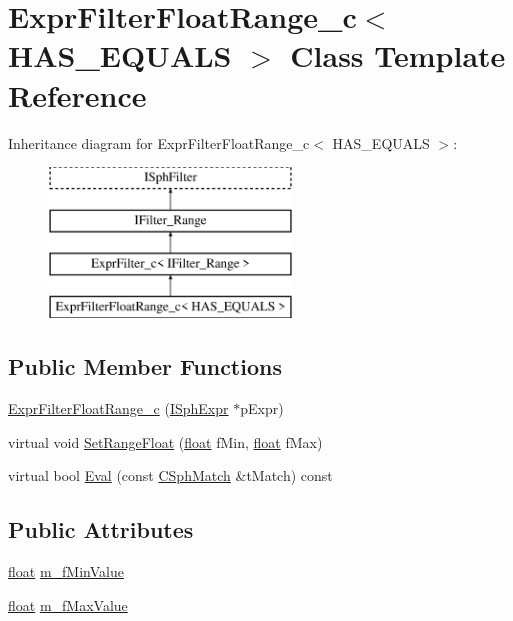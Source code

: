 \hypertarget{classExprFilterFloatRange__c}{\section{Expr\-Filter\-Float\-Range\-\_\-c$<$ H\-A\-S\-\_\-\-E\-Q\-U\-A\-L\-S $>$ Class Template Reference}
\label{classExprFilterFloatRange__c}
}
Inheritance diagram for Expr\-Filter\-Float\-Range\-\_\-c$<$ H\-A\-S\-\_\-\-E\-Q\-U\-A\-L\-S $>$\-:\begin{figure}[H]
\begin{center}
\leavevmode
\includegraphics[height=4.000000cm]{classExprFilterFloatRange__c}
\end{center}
\end{figure}
\subsection*{Public Member Functions}
\begin{DoxyCompactItemize}
\item 
\hyperlink{classExprFilterFloatRange__c_a2ae99a57f7de61961aaa5b6154ab0061}{Expr\-Filter\-Float\-Range\-\_\-c} (\hyperlink{structISphExpr}{I\-Sph\-Expr} $\ast$p\-Expr)
\item 
virtual void \hyperlink{classExprFilterFloatRange__c_ab3d6e6fbabb0920b6b80ba2970b99a38}{Set\-Range\-Float} (\hyperlink{sphinxexpr_8cpp_a0e0d0739f7035f18f949c2db2c6759ec}{float} f\-Min, \hyperlink{sphinxexpr_8cpp_a0e0d0739f7035f18f949c2db2c6759ec}{float} f\-Max)
\item 
virtual bool \hyperlink{classExprFilterFloatRange__c_a0d53d4f9429760d976e4983f1f153469}{Eval} (const \hyperlink{classCSphMatch}{C\-Sph\-Match} \&t\-Match) const 
\end{DoxyCompactItemize}
\subsection*{Public Attributes}
\begin{DoxyCompactItemize}
\item 
\hyperlink{sphinxexpr_8cpp_a0e0d0739f7035f18f949c2db2c6759ec}{float} \hyperlink{classExprFilterFloatRange__c_a9efb6088d5a1b34a999916726b30de8e}{m\-\_\-f\-Min\-Value}
\item 
\hyperlink{sphinxexpr_8cpp_a0e0d0739f7035f18f949c2db2c6759ec}{float} \hyperlink{classExprFilterFloatRange__c_aa75bdd31c007c175b24e18f57f04299b}{m\-\_\-f\-Max\-Value}
\end{DoxyCompactItemize}
